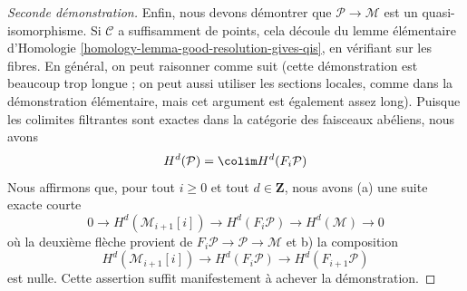 \begin{proof}[Seconde démonstration]
\medskip\noindent
Enfin, nous devons démontrer que $\mathcal{P} \to \mathcal{M}$ est un quasi-isomorphisme.
Si $\mathcal{C}$ a suffisamment de points, cela découle du lemme élémentaire d'Homologie \ref{homology-lemma-good-resolution-gives-qis}, en vérifiant sur les fibres.
En général, on peut raisonner comme suit (cette démonstration est beaucoup trop longue ; on peut aussi utiliser les sections locales, comme dans la démonstration élémentaire, mais cet argument est également assez long).
Puisque les colimites filtrantes sont exactes dans la catégorie des faisceaux abéliens, nous avons
$$
H^d(\mathcal{P}) = \colim H^d(F_i\mathcal{P})
$$
Nous affirmons que, pour tout $i \geq 0$ et tout $d \in \mathbf{Z}$, nous avons (a) une suite exacte courte
$$
0 \to H^d(\mathcal{M}_{i + 1}[i]) \to
H^d(F_i\mathcal{P}) \to H^d(\mathcal{M}) \to 0
$$
où la deuxième flèche provient de $F_i\mathcal{P} \to \mathcal{P} \to \mathcal{M}$ et b) la composition
$$
H^d(\mathcal{M}_{i + 1}[i]) \to
H^d(F_i\mathcal{P}) \to
H^d(F_{i + 1}\mathcal{P})
$$
est nulle.
Cette assertion suffit manifestement à achever la démonstration.


\end{proof}
